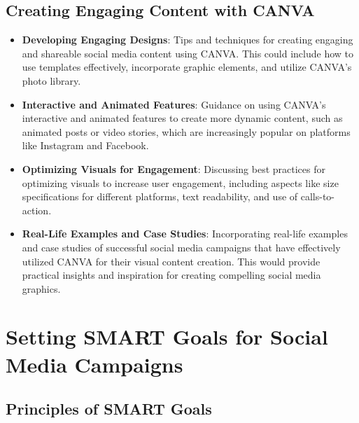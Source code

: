 \documentclass[
]{book}
\providecommand{\tightlist}{%
  \setlength{\itemsep}{0pt}\setlength{\parskip}{0pt}}
\begin{document}
\hypertarget{creating-engaging-content-with-canva}{%
\section*{Creating Engaging Content with CANVA}\label{creating-engaging-content-with-canva}}

\begin{itemize}
\tightlist
\item
  \textbf{Developing Engaging Designs}: Tips and techniques for creating engaging and shareable social media content using CANVA. This could include how to use templates effectively, incorporate graphic elements, and utilize CANVA's photo library.
\item
  \textbf{Interactive and Animated Features}: Guidance on using CANVA's interactive and animated features to create more dynamic content, such as animated posts or video stories, which are increasingly popular on platforms like Instagram and Facebook.
\item
  \textbf{Optimizing Visuals for Engagement}: Discussing best practices for optimizing visuals to increase user engagement, including aspects like size specifications for different platforms, text readability, and use of calls-to-action.
\item
  \textbf{Real-Life Examples and Case Studies}: Incorporating real-life examples and case studies of successful social media campaigns that have effectively utilized CANVA for their visual content creation. This would provide practical insights and inspiration for creating compelling social media graphics.
\end{itemize}

\hypertarget{setting-smart-goals-for-social-media-campaigns}{%
\chapter{Setting SMART Goals for Social Media Campaigns}\label{setting-smart-goals-for-social-media-campaigns}}

\hypertarget{principles-of-smart-goals}{%
\section*{Principles of SMART Goals}\label{principles-of-smart-goals}}
\end{document}
